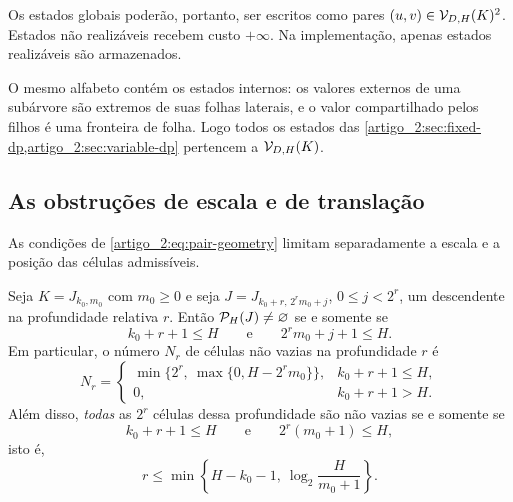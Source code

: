 Os estados globais poderão, portanto, ser escritos como pares
$(u,v)\in\mathcal{V}_{D,H}(K)^2$. Estados não realizáveis recebem custo
$+\infty$. Na implementação, apenas estados realizáveis são armazenados.

O mesmo alfabeto contém os estados internos: os valores externos de uma subárvore são extremos de suas folhas laterais, e o valor compartilhado pelos filhos é uma fronteira de folha. Logo todos os estados das \cref{artigo_2:sec:fixed-dp,artigo_2:sec:variable-dp} pertencem a $\mathcal{V}_{D,H}(K)$.

\subsection{As obstruções de escala e de translação}

As condições de \eqref{artigo_2:eq:pair-geometry} limitam separadamente a escala e a posição das células admissíveis.

\begin{proposition}\label{map:artigo_2:4.5}
\label{artigo_2:prop:translation-obstruction}
Seja $K=J_{k_0,m_0}$ com $m_0\ge0$ e seja
$J=J_{k_0+r,\,2^rm_0+j}$, $0\le j<2^r$, um descendente na profundidade
relativa $r$. Então $\mathcal{P}_H(J)\ne\varnothing$ se e somente se
\begin{equation}
 k_0+r+1\le H
 \qquad\text{e}\qquad
 2^rm_0+j+1\le H.
 \label{artigo_2:eq:two-obstructions}
\end{equation}
Em particular, o número $N_r$ de células não vazias na profundidade $r$ é
\begin{equation}
 N_r=
 \begin{cases}
 \min\{2^r,\ \max\{0,H-2^rm_0\}\},&k_0+r+1\le H,\\
 0,&k_0+r+1>H.
 \end{cases}
 \label{artigo_2:eq:nonempty-cell-count}
\end{equation}
Além disso, \emph{todas} as $2^r$ células dessa profundidade são não vazias
se e somente se
\begin{equation}
 k_0+r+1\le H
 \qquad\text{e}\qquad
 2^r(m_0+1)\le H,
 \label{artigo_2:eq:uniform-refinement-conditions}
\end{equation}
isto é,
\begin{equation}
 r\le
 \min\!\left\{H-k_0-1,\ \log_2\frac{H}{m_0+1}\right\}.
 \label{artigo_2:eq:uniform-refinement-depth}
\end{equation}
\end{proposition}

